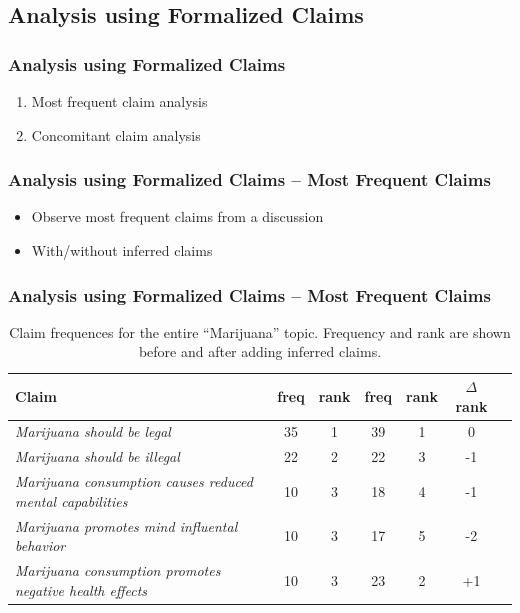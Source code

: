 \documentclass{beamer}
\begin{document}
\subsection{Analysis using Formalized Claims}

\begin{frame}
	\frametitle{Analysis using Formalized Claims}
	\begin{enumerate}
		\item Most frequent claim analysis
			\vspace{1cm}
		\item Concomitant claim analysis
	\end{enumerate}
\end{frame}

\begin{frame}
	\frametitle{Analysis using Formalized Claims -- Most Frequent Claims}

	\begin{itemize}
		\item Observe most frequent claims from a discussion
			\vspace{1cm}
		\item With/without inferred claims
	\end{itemize}
\end{frame}

\begin{frame}
	\frametitle{Analysis using Formalized Claims -- Most Frequent Claims}

\begin{table}[t]
\centering

\renewcommand{\arraystretch}{1.5}%
\scriptsize
\begin{tabular}{p{4 cm} | cc | cc | cc}
	\toprule
	\textbf{Claim} & freq & rank & freq & rank & $\Delta$rank \\
\midrule
	\emph{Marijuana should be legal 				}& 35 & 1 & 39 & 1 & 0 \\
	\emph{Marijuana should be illegal 				}& 22 & 2 & 22 & 3 & -1 \\
	\emph{Marijuana consumption causes reduced mental capabilities} & 10 & 3 & 18 & 4 & -1 \\
	\emph{Marijuana promotes mind influental behavior 		}& 10 & 3 & 17 & 5 & -2 \\
	\emph{Marijuana consumption promotes negative health effects 	}& 10 & 3 & 23 & 2 & +1 \\
\bottomrule 
\end{tabular}
\caption{Claim frequences for the entire ``Marijuana'' topic. Frequency and rank are
	shown before and after adding inferred claims. }
\end{table}

\end{frame}
\end{document}
